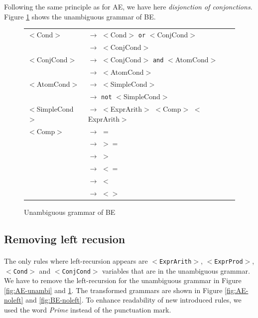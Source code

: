 \documentclass[letterpaper]{article}
\begin{document}
Following the same principle as for AE, we have here
\textit{disjonction of conjonctions}. Figure \ref{fig:BE-unambi}
shows the unambiguous grammar of BE.


\begin{figure}[H]
    \centering
    \begin{tabular}{l l}
        $<$Cond$>$ & $\rightarrow$ $<$Cond$>$ \texttt{or} $<$ConjCond$>$ \\
         & $\rightarrow$ $<$ConjCond$>$\\

        $<$ConjCond$>$ & $\rightarrow$
        $<$ConjCond$>$ \texttt{and} $<$AtomCond$>$\\
         & $\rightarrow$ $<$AtomCond$>$\\

        $<$AtomCond$>$ & $\rightarrow$ $<$SimpleCond$>$\\
         & $\rightarrow$ \texttt{not} $<$SimpleCond$>$\\

        $<$SimpleCond$>$ & $\rightarrow$
        $<$ExprArith$>$ $<$Comp$>$ $<$ExprArith$>$\\

        $<$Comp$>$ & $\rightarrow$ $=$\\
         & $\rightarrow$ $>=$\\
         & $\rightarrow$ $>$\\
         & $\rightarrow$ $<=$\\
         & $\rightarrow$ $<$\\
         & $\rightarrow$ $<>$\\
    \end{tabular}
    \caption{Unambiguous grammar of BE}
    \label{fig:BE-unambi}

\end{figure}


\subsection{Removing left recusion}
\paragraph{}

The only rules where left-recursion appears are \texttt{$<$ExprArith$>$},
\texttt{$<$ExprProd$>$}, \texttt{$<$Cond$>$} and \texttt{$<$ConjCond$>$}
variables
that are in the unambiguous grammar.
We have to remove the left-recursion for the unambiguous grammar
in Figure \ref{fig:AE-unambi} and \ref{fig:BE-unambi}. The transformed
grammars are shown in Figure \ref{fig:AE-noleft} and \ref{fig:BE-noleft}.
To enhance readability of new introduced rules,
we used the word \textit{Prime} instead of the punctuation mark.
\end{document}
